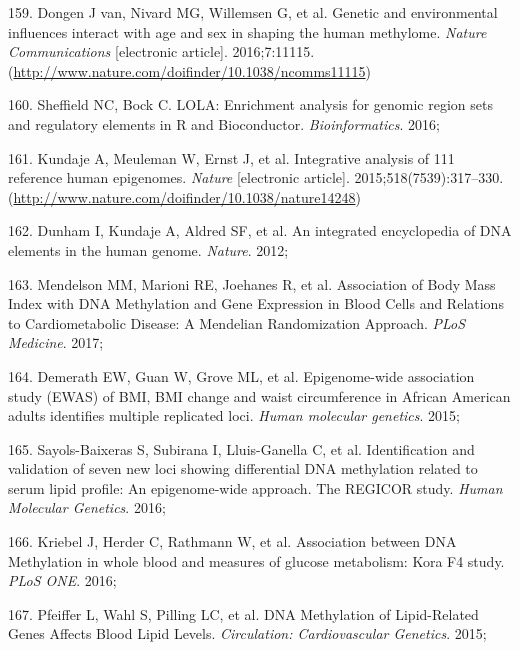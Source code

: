 \documentclass[11pt,oneside]{bristolthesis}
\newenvironment{cslreferences}%
  {}%
  {\par}
\begin{document}
\begin{cslreferences}
\leavevmode\hypertarget{ref-VanDongen2016}{}%
159. Dongen J van, Nivard MG, Willemsen G, et al. Genetic and environmental influences interact with age and sex in shaping the human methylome. \emph{Nature Communications} {[}electronic article{]}. 2016;7:11115. (\url{http://www.nature.com/doifinder/10.1038/ncomms11115})

\leavevmode\hypertarget{ref-Sheffield2016}{}%
160. Sheffield NC, Bock C. LOLA: Enrichment analysis for genomic region sets and regulatory elements in R and Bioconductor. \emph{Bioinformatics}. 2016;

\leavevmode\hypertarget{ref-Kundaje2015}{}%
161. Kundaje A, Meuleman W, Ernst J, et al. Integrative analysis of 111 reference human epigenomes. \emph{Nature} {[}electronic article{]}. 2015;518(7539):317--330. (\url{http://www.nature.com/doifinder/10.1038/nature14248})

\leavevmode\hypertarget{ref-Dunham2012}{}%
162. Dunham I, Kundaje A, Aldred SF, et al. An integrated encyclopedia of DNA elements in the human genome. \emph{Nature}. 2012;

\leavevmode\hypertarget{ref-Mendelson2017}{}%
163. Mendelson MM, Marioni RE, Joehanes R, et al. Association of Body Mass Index with DNA Methylation and Gene Expression in Blood Cells and Relations to Cardiometabolic Disease: A Mendelian Randomization Approach. \emph{PLoS Medicine}. 2017;

\leavevmode\hypertarget{ref-Demerath2015}{}%
164. Demerath EW, Guan W, Grove ML, et al. Epigenome-wide association study (EWAS) of BMI, BMI change and waist circumference in African American adults identifies multiple replicated loci. \emph{Human molecular genetics}. 2015;

\leavevmode\hypertarget{ref-Sayols-Baixeras2016}{}%
165. Sayols-Baixeras S, Subirana I, Lluis-Ganella C, et al. Identification and validation of seven new loci showing differential DNA methylation related to serum lipid profile: An epigenome-wide approach. The REGICOR study. \emph{Human Molecular Genetics}. 2016;

\leavevmode\hypertarget{ref-Kriebel2016}{}%
166. Kriebel J, Herder C, Rathmann W, et al. Association between DNA Methylation in whole blood and measures of glucose metabolism: Kora F4 study. \emph{PLoS ONE}. 2016;

\leavevmode\hypertarget{ref-Pfeiffer2015}{}%
167. Pfeiffer L, Wahl S, Pilling LC, et al. DNA Methylation of Lipid-Related Genes Affects Blood Lipid Levels. \emph{Circulation: Cardiovascular Genetics}. 2015;


\end{cslreferences}
\end{document}

